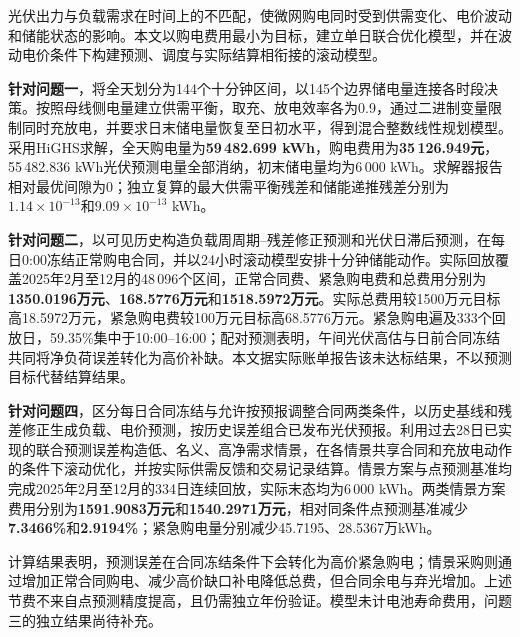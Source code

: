 光伏出力与负载需求在时间上的不匹配，使微网购电同时受到供需变化、电价波动和储能状态的影响。本文以购电费用最小为目标，建立单日联合优化模型，并在波动电价条件下构建预测、调度与实际结算相衔接的滚动模型。

\textbf{针对问题一}，将全天划分为144个十分钟区间，以145个边界储电量连接各时段决策。按照母线侧电量建立供需平衡，取充、放电效率各为0.9，通过二进制变量限制同时充放电，并要求日末储电量恢复至日初水平，得到混合整数线性规划模型。采用HiGHS求解，全天购电量为\textbf{59\,482.699 kWh}，购电费用为\textbf{35\,126.949元}，55\,482.836 kWh光伏预测电量全部消纳，初末储电量均为6\,000 kWh。求解器报告相对最优间隙为0；独立复算的最大供需平衡残差和储能递推残差分别为$1.14\times10^{-13}$和$9.09\times10^{-13}$ kWh。

\textbf{针对问题二}，以可见历史构造负载周周期--残差修正预测和光伏日滞后预测，在每日0:00冻结正常购电合同，并以24小时滚动模型安排十分钟储能动作。实际回放覆盖2025年2月至12月的48\,096个区间，正常合同费、紧急购电费和总费用分别为\textbf{1350.0196万元}、\textbf{168.5776万元}和\textbf{1518.5972万元}。实际总费用较1500万元目标高18.5972万元，紧急购电费较100万元目标高68.5776万元。紧急购电遍及333个回放日，59.35\%集中于10:00--16:00；配对预测表明，午间光伏高估与日前合同冻结共同将净负荷误差转化为高价补缺。本文据实际账单报告该未达标结果，不以预测目标代替结算结果。

\textbf{针对问题四}，区分每日合同冻结与允许按预报调整合同两类条件，以历史基线和残差修正生成负载、电价预测，按历史误差组合已发布光伏预报。利用过去28日已实现的联合预测误差构造低、名义、高净需求情景，在各情景共享合同和充放电动作的条件下滚动优化，并按实际供需反馈和交易记录结算。情景方案与点预测基准均完成2025年2月至12月的334日连续回放，实际末态均为6\,000 kWh。两类情景方案费用分别为\textbf{1591.9083万元}和\textbf{1540.2971万元}，相对同条件点预测基准减少\textbf{7.3466\%}和\textbf{2.9194\%}；紧急购电量分别减少45.7195、28.5367万kWh。

计算结果表明，预测误差在合同冻结条件下会转化为高价紧急购电；情景采购则通过增加正常合同购电、减少高价缺口补电降低总费，但合同余电与弃光增加。上述节费不来自点预测精度提高，且仍需独立年份验证。模型未计电池寿命费用，问题三的独立结果尚待补充。
